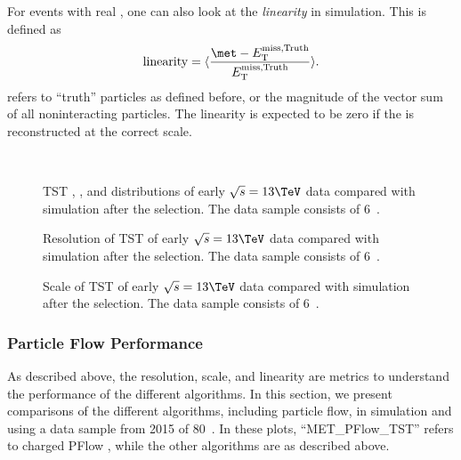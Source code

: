 For events with real \met, one can also look at the \textit{linearity} in simulation.
This is defined as
\begin{equation}
\text{linearity} = \langle \frac{\met - \mettrue}{\mettrue}  \rangle.
\end{equation}
\mettrue refers to ``truth'' particles as defined before, or the magnitude of the vector sum of all noninteracting particles.
The linearity is expected to be zero if the \met is reconstructed at the correct scale.

\begin{figure}
\caption{TST , , and \met distributions of early $\sqrt{s} = 13 \TeV$ data compared with simulation after the \Zmm selection. The data sample consists of 6~\ipb.} \label{fig:tst_met_zmumu}
 \\
\end{figure}

\begin{figure}
\caption{Resolution of TST \met of early $\sqrt{s} = 13 \TeV$ data compared with simulation after the \Zmm selection. The data sample consists of 6~\ipb.} \label{fig:tst_met_resolution_zmumu}
\end{figure}

\begin{figure}
\caption{Scale of TST \met of early $\sqrt{s} = 13 \TeV$ data compared with simulation after the \Zmm selection. The data sample consists of 6~\ipb.} \label{fig:tst_met_scale_zmumu}
\end{figure}


\subsubsection{Particle Flow Performance}

As described above, the resolution, scale, and linearity are metrics to understand the performance of the different \met algorithms.
In this section, we present comparisons of the different algorithms, including particle flow, in simulation and using a data sample from 2015 of 80~\ipb.
In these plots, ``MET\_PFlow\_TST'' refers to charged PFlow \met, while the other algorithms are as described above.

